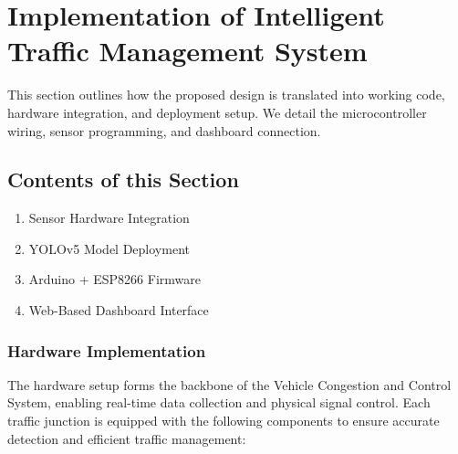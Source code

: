 \chapter{Implementation of Intelligent Traffic Management System}

This section outlines how the proposed design is translated into working code, hardware integration, and deployment setup. We detail the microcontroller wiring, sensor programming, and dashboard connection.

\section{Contents of this Section}
\begin{enumerate}
\item Sensor Hardware Integration
\item YOLOv5 Model Deployment
\item Arduino + ESP8266 Firmware
\item Web-Based Dashboard Interface
\end{enumerate}

\subsection{Hardware Implementation}

The hardware setup forms the backbone of the Vehicle Congestion and Control System, enabling real-time data collection and physical signal control. Each traffic junction is equipped with the following components to ensure accurate detection and efficient traffic management:

